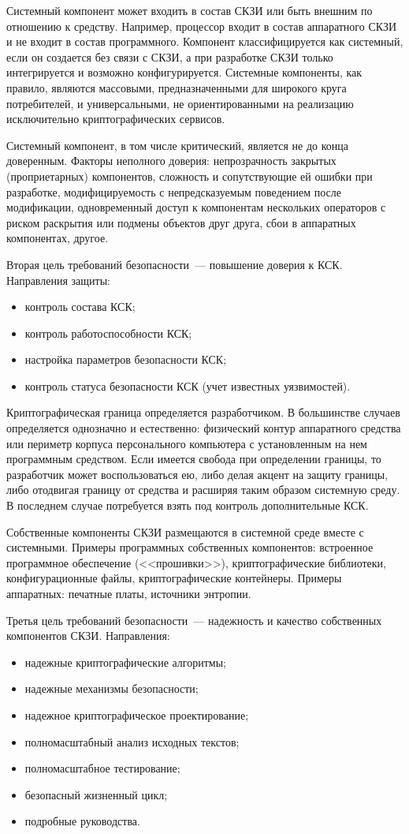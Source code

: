 Системный компонент может входить в состав СКЗИ или быть внешним по отношению
к средству. Например, процессор входит в состав аппаратного СКЗИ и не входит в 
состав программного. 
%
Компонент классифицируется как системный, если он создается без связи с 
СКЗИ, а при разработке СКЗИ только интегрируется и\addendum{,} 
возможно\addendum{,} конфигурируется.
%
Системные компоненты, как правило, являются массовыми, предназначенными для 
широкого круга потребителей, и универсальными, не ориентированными на 
реализацию исключительно криптографических сервисов.

Системный компонент, в том числе критический, является не до конца доверенным. 
% 
Факторы неполного доверия:
%
непрозрачность закрытых (проприетарных) компонентов,
%
сложность и сопутствующие ей ошибки при разработке,
%
модифицируемость с непредсказуемым поведением после модификации,
%
одновременный доступ к компонентам нескольких операторов с риском раскрытия или 
подмены объектов друг друга,
%
сбои в аппаратных компонентах,
%
другое.

Вторая цель требований безопасности~--- повышение доверия к КСК. 
Направления защиты:
\begin{itemize}
\item
контроль состава КСК;
\item
контроль работоспособности КСК;
\item
настройка параметров безопасности КСК;
\item
контроль статуса безопасности КСК (учет известных уязвимостей).
\end{itemize}

Криптографическая граница определяется разработчиком.
В большинстве случаев определяется однозначно и естественно:  
физический контур аппаратного средства или периметр корпуса персонального 
компьютера с установленным на нем программным средством.
%
Если имеется свобода при определении границы, то разработчик может
воспользоваться ею, либо делая акцент на защиту границы, либо отодвигая границу
от средства и расширяя таким образом системную среду. В последнем случае
потребуется взять под контроль дополнительные КСК.

Собственные компоненты СКЗИ размещаются в системной среде вместе с системными.
Примеры программных собственных компонентов: 
встроенное программное обеспечение (<<прошивки>>),
криптографические библиотеки, конфигурационные файлы, криптографические 
контейнеры.
%
Примеры аппаратных: печатные платы, источники энтропии.

Третья цель требований безопасности~--- надежность и качество собственных 
компонентов СКЗИ.
%
Направления:
\begin{itemize}
\item 
надежные криптографические алгоритмы;
\item 
надежные механизмы безопасности;
\item 
надежное криптографическое проектирование;
\item 
полномасштабный анализ исходных текстов;
\item 
полномасштабное тестирование;
\item 
безопасный жизненный цикл;
\item 
подробные руководства.
\end{itemize}
